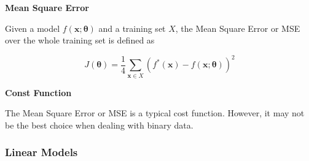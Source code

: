 \begin{framed}
\begin{remark}{\textbf{Mean Square Error}}

Given a model $f(\mathbf{x};\boldsymbol{\theta})$ and a training set $X$, the Mean Square Error or MSE
over the whole training set is defined as

\begin{equation}
J(\boldsymbol{\theta}) = \frac{1}{4}\sum_{\mathbf{x} \in X} (f^{*}(\mathbf{x})-f(\mathbf{x};\boldsymbol{\theta}))^2
\end{equation}

\end{remark}
\end{framed}

\begin{framed}
\begin{remark}{\textbf{Const Function}}

The Mean Square Error or MSE is a typical cost function. However, it may not be the best
choice when dealing with binary data.

\end{remark}
\end{framed}

\subsubsection{Linear Models}

